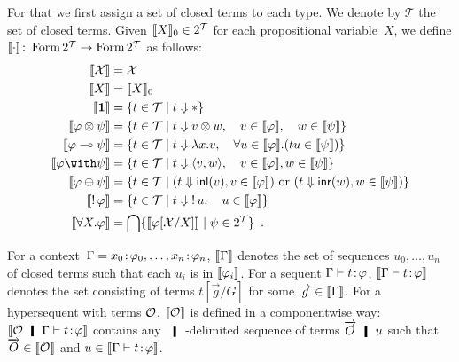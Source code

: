 For that we first assign a set of closed terms to each type.
\newcommand{\terms}{\mathcal{T}}
We denote by $\terms$ the set of closed terms.
Given $\semo{X}_0\in 2^\terms$ for each propositional variable~$X$,
we define $\semo{\cdot}\colon \form{2^\terms}\rightarrow \form{2^\terms}$
as follows:
\begin{align*}
 \semo{\mathcal X} &= \mathcal X\\
 \semo{X} &= \semo{X}_0\\
 \semo{\one} &= \{t\in \terms \mid t\eval \ast\} \\
 \semo{\phi\otimes \psi}&= \{t\in\terms \mid t\eval v\otimes w,\quad
 v\in\semo{\phi},\quad w\in \semo{\psi}\}\\
 \semo{\phi\limp\psi}&= \{t\in\terms \mid t\eval \lambda x.v,\quad
 \forall u\in\semo{\phi}.(tu\in\semo{\psi})\}\\
 \semo{\phi\with\psi}&= \{t\in\terms \mid t\eval\lpair{v,w},\quad
 v\in\semo{\phi}, w\in\semo{\psi}\}\\
 \semo{\phi\oplus\psi}&= \{t\in\terms\mid (t\eval \inl{v}, v\in
 \semo{\phi})\text{ or }(t\eval\inr{w}, w \in \semo{\psi})\}\\
 \semo{\bang \phi}&= \{t\in\terms \mid t\eval \bang u, \quad u\in\semo{\phi}\}\\
 \semo{\forall X.\phi}&= \bigcap\{\semo{\phi[\mathcal X/X]}\mid \psi\in
 2^\terms\}\enspace.
\end{align*}

For a context~$\Gamma = {x_0} \mathord{\colon\kern -2pt}{\varphi_0},\ldots,{x_n} \mathord{\colon\kern -2pt}{\varphi_n}$,
$\llbracket{\Gamma}\rrbracket$ denotes the set of sequences $u_0,\ldots,u_n$ of closed terms
such that each $u_i$ is in $\llbracket{\varphi_i}\rrbracket$.
For a sequent $\Gamma\vdash{t} \mathord{\colon\kern -2pt}{\varphi}$, $\llbracket{\Gamma\vdash {t} \mathord{\colon\kern -2pt}{\varphi} }\rrbracket$ denotes
the set consisting of terms $t[\vec g/G]$ for some $\overrightarrow g\in\llbracket{\Gamma}\rrbracket$.
For a hypersequent with terms $\mathcal{O}$,
$\llbracket{\mathcal{O}}\rrbracket$ is defined in a componentwise way:
$\semo{\hypert\hmid\G\tr\tj t\phi}$ contains any $\hmid$-delimited
sequence of terms
$\vec O \hmid u$ such that $\overrightarrow O\in\llbracket{\mathcal{O}}\rrbracket$ and
$u\in\llbracket{\Gamma\vdash {t} \mathord{\colon\kern -2pt}{\varphi} }\rrbracket$.

